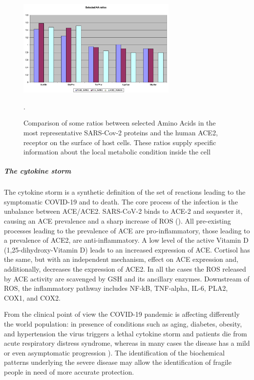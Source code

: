\documentclass[graybox]{svmult}
\begin{document}
\begin{figure}[t]
\center
\includegraphics[width=0.7\textwidth]{R1AB_R1A_ACE2_ch2.png}
\caption{Comparison of some ratios between selected Amino Acids in the most representative SARS-Cov-2 proteins and the human ACE2, receptor on the surface of host cells. These ratios supply specific information about the local metabolic condition inside the cell \cite{vernone2019analysis}}.
\label{ch2}
\end{figure}

\subparagraph{The cytokine storm}

The cytokine storm is a synthetic definition of the set of reactions leading to the symptomatic COVID-19 and to death. The core process of the infection is the unbalance between ACE/ACE2. SARS-CoV-2 binds to ACE-2 and sequester it, causing an ACE prevalence and a sharp increase of ROS (\cite{soy2020cytokine,hu2021cytokine}).
All pre-existing processes leading to the prevalence of ACE are pro-inflammatory, those leading to a prevalence of ACE2, are anti-inflammatory.
A low level of the active Vitamin D (1,25-dihydroxy-Vitamin D) leads to an increased expression of ACE. Cortisol has the same, but with an independent mechanism, effect on ACE expression and, additionally, decreases the expression of ACE2.
In all the cases the ROS released by ACE activity are scavenged by GSH and its ancillary enzymes. Downstream of ROS, the inflammatory pathway includes NF-kB, TNF-alpha,  IL-6, PLA2, COX1,  and COX2. 


From the clinical point of view the COVID-19 pandemic is affecting differently the world population: in presence of conditions such as aging, diabetes, obesity, and hypertension the virus triggers a lethal cytokine storm and patients die from acute respiratory distress syndrome, whereas in many cases the disease has a mild or even asymptomatic progression \cite{gao2021risk}). The identification of the biochemical patterns underlying the severe disease may allow the identification of fragile people in need of more accurate protection.
\end{document}
